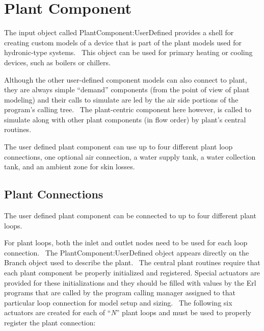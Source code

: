 \section{Plant Component}\label{plant-component}

The input object called PlantComponent:UserDefined provides a shell for creating custom models of a device that is part of the plant models used for hydronic-type systems.~ This object can be used for primary heating or cooling devices, such as boilers or chillers.

Although the other user-defined component models can also connect to plant, they are always simple ``demand'' components (from the point of view of plant modeling) and their calls to simulate are led by the air side portions of the program's calling tree.~ The plant-centric component here however, is called to simulate along with other plant components (in flow order) by plant's central routines.

The user defined plant component can use up to four different plant loop connections, one optional air connection, a water supply tank, a water collection tank, and an ambient zone for skin losses.

\subsection{Plant Connections}\label{plant-connections-001}

The user defined plant component can be connected to up to four different plant loops.

For plant loops, both the inlet and outlet nodes need to be used for each loop connection.~ The PlantComponent:UserDefined object appears directly on the Branch object used to describe the plant.~ The central plant routines require that each plant component be properly initialized and registered. Special actuators are provided for these initializations and they should be filled with values by the Erl programs that are called by the program calling manager assigned to that particular loop connection for model setup and sizing.~ The following six actuators are created for each of ``\emph{N}'' plant loops and must be used to properly register the plant connection:

